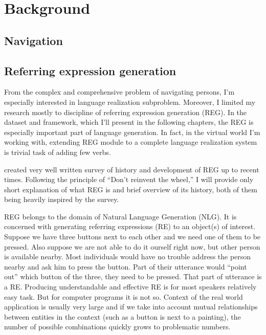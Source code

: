 \chapter{Background}
\label{chap:bg}

\section{Navigation}


\section{Referring expression generation}
\label{sec:bg-reg}
From the complex and comprehensive problem of navigating persons, I'm especially interested in language realization subproblem. Moreover, I limited my research mostly to discipline of referring expression generation (REG). In the dataset and framework, which I'll present in the following chapters, the REG is especially important part of language generation. In fact, in the virtual world I'm working with, extending REG module to a complete language realization system is trivial task of adding few verbs.

\citet{krahmer2012computational} created very well written survey of history and development of REG up to recent times. Following the principle of ``Don't reinvent the wheel,'' I will provide only short explanation of what REG is and brief overview of its history, both of them being heavily inspired by the survey.

REG belongs to the domain of Natural Language Generation (NLG). It is concerned with generating referring expressions (RE) to an object(s) of interest. Suppose we have three buttons next to each other and we need one of them to be pressed. Also suppose we are not able to do it ourself right now, but other person is available nearby. Most individuals would have no trouble address the person nearby and ask him to press the button. Part of their utterance would ``point out'' which button of the three, they need to be pressed. That part of utterance is a RE. Producing understandable and effective RE is for most speakers relatively easy task. But for computer programs it is not so. Context of the real world application is usually very large and if we take into account mutual relationships between entities in the context (such as a button is next to a painting), the number of possible combinations quickly grows to problematic numbers. 

